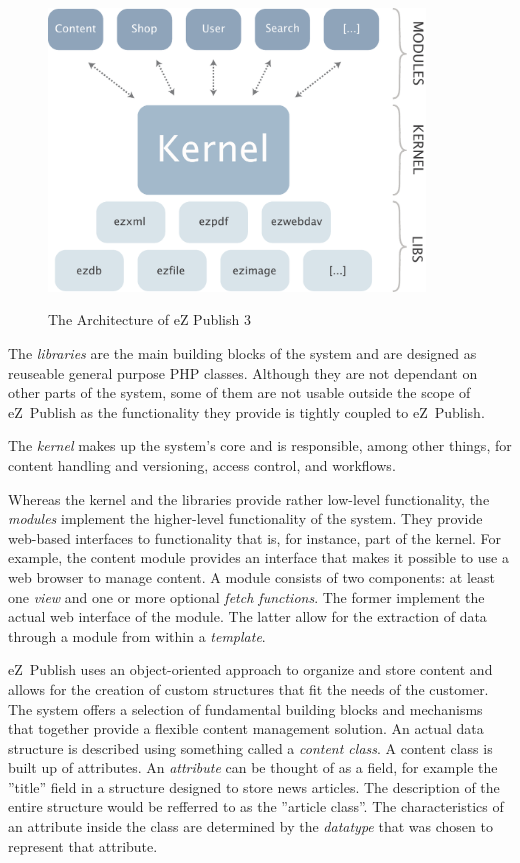 \begin{figure}[hbt]
\begin{center}
\includegraphics[width=10cm]{figures/ArchitectureEZPublish3}\\[5mm]
\end{center}
\caption{The Architecture of eZ Publish 3}
\label{figure-ArchitectureEZPublish3}
\end{figure}

The \emph{libraries} are the main building blocks of the system and are
designed as reuseable general purpose PHP classes. Although they are not
dependant on other parts of the system, some of them are not usable outside
the scope of eZ~Publish as the functionality they provide is tightly
coupled to eZ~Publish.

The \emph{kernel} makes up the system's core and is responsible, among other
things, for content handling and versioning, access control, and workflows. 

Whereas the kernel and the libraries provide rather low-level functionality,
the \emph{modules} implement the higher-level functionality of the system. They
provide web-based interfaces to functionality that is, for instance, part of
the kernel. For example, the content module provides an interface that makes
it possible to use a web browser to manage content. A module consists of two
components: at least one \emph{view} and one or more optional
\emph{fetch functions}. The former implement the actual web interface of the
module. The latter allow for the extraction of data through a module from
within a \emph{template}.

eZ~Publish uses an object-oriented approach to organize and store content
and allows for the creation of custom structures that fit the needs of the
customer. The system offers a selection of fundamental building blocks and
mechanisms that together provide a flexible content management solution. An
actual data structure is described using something called a \emph{content class}.
A content class is built up of attributes. An \emph{attribute} can be thought of
as a field, for example the ''title'' field in a structure designed to store
news articles. The description of the entire structure would be refferred to as
the ''article class''. The characteristics of an attribute inside the class are
determined by the \emph{datatype} that was chosen to represent that attribute.

